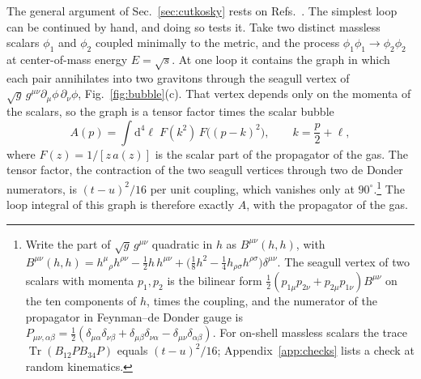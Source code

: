 \documentclass[a4paper,11pt]{article}
\newcommand{\dd}{\mathrm{d}}
\newcommand{\Tr}{\operatorname{Tr}}
\begin{document}
The general argument of Sec.~\ref{sec:cutkosky} rests on Refs.~\cite{PiusSen2016,BrisceseModesto2019}. The simplest loop can be continued by hand, and doing so tests it. Take two distinct massless scalars $\phi_1$ and $\phi_2$ coupled minimally to the metric, and the process $\phi_1\phi_1\to\phi_2\phi_2$ at center-of-mass energy $E=\sqrt s$. At one loop it contains the graph in which each pair annihilates into two gravitons through the seagull vertex of $\sqrt g\,g^{\mu\nu}\partial_\mu\phi\,\partial_\nu\phi$, Fig.~\ref{fig:bubble}(c). That vertex depends only on the momenta of the scalars, so the graph is a tensor factor times the scalar bubble
\begin{equation}
\label{eq:bubble}
A(p)=\int\dd^4\ell\;F(k^2)\,F\bigl((p-k)^2\bigr),\qquad k=\frac p2+\ell ,
\end{equation}
where $F(z)=1/[z\,a(z)]$ is the scalar part of the propagator of the gas.
The tensor factor, the contraction of the two seagull vertices through two de Donder numerators, is $(t-u)^2/16$ per unit coupling, which vanishes only at $90^\circ$.\footnote{Write the part of $\sqrt g\,g^{\mu\nu}$ quadratic in $h$ as $B^{\mu\nu}(h,h)$, with $B^{\mu\nu}(h,h)=h^{\mu}{}_{\rho}h^{\rho\nu}-\frac12h\,h^{\mu\nu}+\bigl(\frac18h^2-\frac14h_{\rho\sigma}h^{\rho\sigma}\bigr)\delta^{\mu\nu}$. The seagull vertex of two scalars with momenta $p_1,p_2$ is the bilinear form $\frac12(p_{1\mu}p_{2\nu}+p_{2\mu}p_{1\nu})B^{\mu\nu}$ on the ten components of $h$, times the coupling, and the numerator of the propagator in Feynman--de Donder gauge is $P_{\mu\nu,\alpha\beta}=\frac12(\delta_{\mu\alpha}\delta_{\nu\beta}+\delta_{\mu\beta}\delta_{\nu\alpha}-\delta_{\mu\nu}\delta_{\alpha\beta})$. For on-shell massless scalars the trace $\Tr(B_{12}PB_{34}P)$ equals $(t-u)^2/16$; Appendix~\ref{app:checks} lists a check at random kinematics.} The loop integral of this graph is therefore exactly $A$, with the propagator of the gas.
\end{document}
